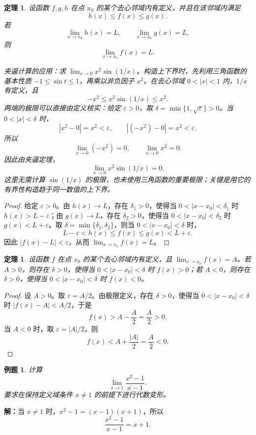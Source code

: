 \documentclass[UTF8,fontset=fandol,11pt]{ctexart}
\newtheorem{theorem}[definition]{定理}
\newtheorem{example}[definition]{例题}
\begin{document}
\begin{theorem}
设函数 $f,g,h$ 在点 $x_0$ 的某个去心邻域内有定义，并且在该邻域内满足
\[
h(x)\leq f(x)\leq g(x).
\]
若
\[
\lim_{x\to x_0}h(x)=L,
\qquad
\lim_{x\to x_0}g(x)=L,
\]
则
\[
\lim_{x\to x_0}f(x)=L.
\]
\label{thm:squeeze-theorem}

夹逼计算的应用：求 $\lim_{x\to0}x^2\sin(1/x)$。构造上下界时，先利用三角函数的基本性质 $-1\leq\sin t\leq1$，再乘以非负因子 $x^2$。在去心邻域 $0<|x|<1$ 内，$1/x$ 有定义，且
\[
-x^2\leq x^2\sin(1/x)\leq x^2.
\]
两端的极限可以直接由定义核实：给定 $\varepsilon>0$，取 $\delta=\min\{1,\sqrt{\varepsilon}\}>0$。当 $0<|x|<\delta$ 时，
\[
|x^2-0|=x^2<\varepsilon,\qquad |(-x^2)-0|=x^2<\varepsilon.
\]
所以
\[
\lim_{x\to0}(-x^2)=0,\qquad \lim_{x\to0}x^2=0.
\]
因此由夹逼定理，
\[
\lim_{x\to0}x^2\sin(1/x)=0.
\]
这里无需计算 $\sin(1/x)$ 的极限，也未使用三角函数的重要极限；关键是用它的有界性构造趋于同一数值的上下界。
\end{theorem}
\begin{proof}
给定 $\varepsilon>0$。由 $h(x)\to L$，存在 $\delta_1>0$，使得当 $0<|x-x_0|<\delta_1$ 时 $h(x)>L-\varepsilon$；由 $g(x)\to L$，存在 $\delta_2>0$，使得当 $0<|x-x_0|<\delta_2$ 时 $g(x)<L+\varepsilon$。取 $\delta=\min\{\delta_1,\delta_2\}$，则当 $0<|x-x_0|<\delta$ 时，
\[
L-\varepsilon<h(x)\leq f(x)\leq g(x)<L+\varepsilon.
\]
因此 $|f(x)-L|<\varepsilon$，从而 $\lim_{x\to x_0}f(x)=L$。
\end{proof}
\begin{theorem}
设函数 $f$ 在点 $x_0$ 的某个去心邻域内有定义，且 $\lim_{x\to x_0}f(x)=A$。若 $A>0$，则存在 $\delta>0$，使得当 $0<|x-x_0|<\delta$ 时 $f(x)>0$；若 $A<0$，则存在 $\delta>0$，使得当 $0<|x-x_0|<\delta$ 时 $f(x)<0$。\label{thm:limit-sign-preservation}
\end{theorem}
\begin{proof}
设 $A>0$。取 $\varepsilon=A/2$。由极限定义，存在 $\delta>0$，使得当 $0<|x-x_0|<\delta$ 时 $|f(x)-A|<A/2$，于是
\[
f(x)>A-\frac{A}{2}=\frac{A}{2}>0.
\]
当 $A<0$ 时，取 $\varepsilon=|A|/2$，则
\[
f(x)<A+\frac{|A|}{2}=\frac{A}{2}<0.
\]

\end{proof}
\begin{example}
计算
\[
\lim_{x\to1}\frac{x^2-1}{x-1}.
\]
要求在保持定义域条件 $x\neq1$ 的前提下进行代数变形。
\end{example}
\par\noindent\textbf{解：}当 $x\neq1$ 时，$x^2-1=(x-1)(x+1)$，所以
\[
\frac{x^2-1}{x-1}=x+1.
\]
\end{document}
